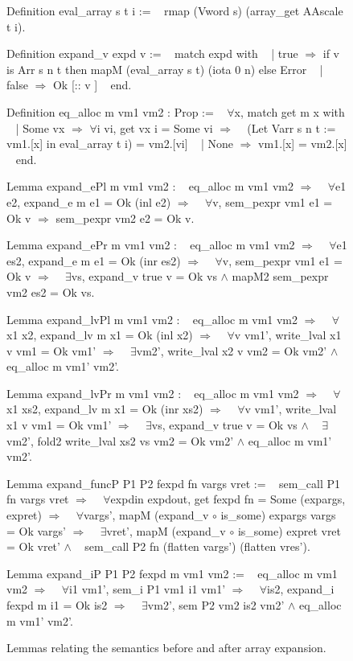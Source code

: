 \documentclass{article}
\begin{document}
\begin{figure}[p]
\obeylines\obeyspaces\ttfamily%
Definition eval\_array s t i :=
~ rmap (Vword s) (array\_get AAscale t i).

Definition expand\_v expd v :=
~ match expd with
~ | true  \(\Rightarrow\) if v is Arr s n t then mapM (eval\_array s t) (iota 0 n) else Error
~ | false \(\Rightarrow\) Ok [:: v ]
~ end.

Definition eq\_alloc m vm1 vm2 : Prop :=
~ \(\forall\)x, match get m x with
~ | Some vx \(\Rightarrow\) \(\forall\)i vi, get vx i = Some vi \(\Longrightarrow\)
~   (Let Varr s n t := vm1.[x] in eval\_array t i) = vm2.[vi]
~ | None \(\Rightarrow\) vm1.[x] = vm2.[x]
~ end.

Lemma expand\_ePl m vm1 vm2 :
~ eq\_alloc m vm1 vm2 \(\Longrightarrow\)
~ \(\forall\)e1 e2, expand\_e m e1 = Ok (inl e2) \(\Longrightarrow\)
~ \(\forall\)v, sem\_pexpr vm1 e1 = Ok v \(\Longrightarrow\) sem\_pexpr vm2 e2 = Ok v.

Lemma expand\_ePr m vm1 vm2 :
~ eq\_alloc m vm1 vm2 \(\Longrightarrow\)
~ \(\forall\)e1 es2, expand\_e m e1 = Ok (inr es2) \(\Longrightarrow\)
~ \(\forall\)v, sem\_pexpr vm1 e1 = Ok v \(\Longrightarrow\)
~ \(\exists\)vs, expand\_v true v = Ok vs \(\wedge\) mapM2 sem\_pexpr vm2 es2 = Ok vs.

Lemma expand\_lvPl m vm1 vm2 :
~ eq\_alloc m vm1 vm2 \(\Longrightarrow\)
~ \(\forall\)x1 x2, expand\_lv m x1 = Ok (inl x2) \(\Longrightarrow\)
~ \(\forall\)v vm1', write\_lval x1 v vm1 = Ok vm1' \(\Longrightarrow\)
~ \(\exists\)vm2', write\_lval x2 v vm2 = Ok vm2' \(\wedge\) eq\_alloc m vm1' vm2'.

Lemma expand\_lvPr m vm1 vm2 :
~ eq\_alloc m vm1 vm2 \(\Longrightarrow\)
~ \(\forall\)x1 xs2, expand\_lv m x1 = Ok (inr xs2) \(\Longrightarrow\)
~ \(\forall\)v vm1', write\_lval x1 v vm1 = Ok vm1' \(\Longrightarrow\)
~ \(\exists\)vs, expand\_v true v = Ok vs \(\wedge\)
~   \(\exists\)vm2', fold2 write\_lval xs2 vs vm2 = Ok vm2' \(\wedge\) eq\_alloc m vm1' vm2'.

Lemma expand\_funcP P1 P2 fexpd fn vargs vret :=
~ sem\_call P1 fn vargs vret \(\Longrightarrow\)
~ \(\forall\)expdin expdout, get fexpd fn = Some (expargs, expret) \(\Longrightarrow\)
~ \(\forall\)vargs', mapM (expand\_v \(\circ\) is\_some) expargs vargs = Ok vargs' \(\Longrightarrow\)
~ \(\exists\)vret',  mapM (expand\_v \(\circ\) is\_some) expret  vret  = Ok vret'  \(\wedge\)
~   sem\_call P2 fn (flatten vargs') (flatten vres').

Lemma expand\_iP P1 P2 fexpd m vm1 vm2 :=
~ eq\_alloc m vm1 vm2 \(\Longrightarrow\)
~ \(\forall\)i1 vm1', sem\_i P1 vm1 i1 vm1' \(\Longrightarrow\)
~ \(\forall\)is2, expand\_i fexpd m i1 = Ok is2 \(\Longrightarrow\)
~ \(\exists\)vm2', sem P2 vm2 is2 vm2' \(\wedge\) eq\_alloc m vm1' vm2'.
\normalfont%
\caption{Lemmas relating the semantics before and after array expansion.}
\end{figure}
\end{document}
